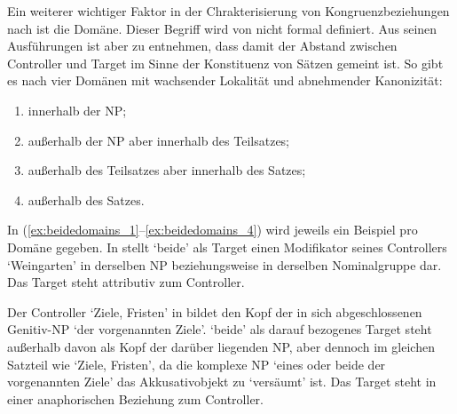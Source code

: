 \label{phsec:domain}

Ein weiterer wichtiger Faktor in der Chrakterisierung von Kongruenzbeziehungen
nach \citet{corbett2006} ist die Domäne. Dieser Begriff wird von
\citet{corbett2006} nicht formal definiert. Aus seinen Ausführungen ist aber zu
entnehmen, dass damit der Abstand zwischen Controller und Target im Sinne der
Konstituenz von Sätzen gemeint ist. So gibt es nach \citet[54]{corbett2006}
vier Domänen mit wachsender Lokalität und abnehmender Kanonizität:

\begin{enumerate}[noitemsep]
	\item innerhalb der NP;
	\item außerhalb der NP aber innerhalb des Teilsatzes;
	\item außerhalb des Teilsatzes aber innerhalb des Satzes;
	\item außerhalb des Satzes.
\end{enumerate}

In (\ref{ex:beidedomains_1}--\ref{ex:beidedomains_4}) wird jeweils ein Beispiel
pro Domäne gegeben. In  stellt  `beide' als
Target einen Modifikator seines Controllers  `Weingarten' in
derselben NP beziehungsweise in derselben Nominalgruppe dar. Das Target steht
attributiv zum Controller.


Der Controller  `Ziele, Fristen' in  bildet
den Kopf der in sich abgeschlossenen Genitiv-NP  `der
vorgenannten Ziele'.  `beide' als darauf bezogenes
Target steht außerhalb davon als Kopf der darüber liegenden NP, aber dennoch im
gleichen Satzteil wie  `Ziele, Fristen', da die komplexe NP
 `eines oder beide der
vorgenannten Ziele' das Akkusativobjekt zu  `versäumt' ist. Das
Target steht in einer anaphorischen Beziehung zum Controller.


